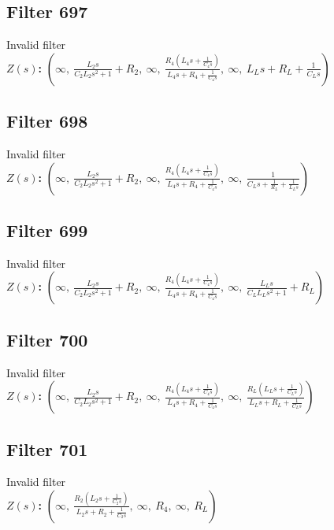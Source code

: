 \documentclass{article}
\begin{document}
\subsection*{Filter 697}
Invalid filter \\ 
\textbf{$Z(s)$:} $\left( \infty, \  \frac{L_{2} s}{C_{2} L_{2} s^{2} + 1} + R_{2}, \  \infty, \  \frac{R_{4} \left(L_{4} s + \frac{1}{C_{4} s}\right)}{L_{4} s + R_{4} + \frac{1}{C_{4} s}}, \  \infty, \  L_{L} s + R_{L} + \frac{1}{C_{L} s}\right)$ \\ 
\subsection*{Filter 698}
Invalid filter \\ 
\textbf{$Z(s)$:} $\left( \infty, \  \frac{L_{2} s}{C_{2} L_{2} s^{2} + 1} + R_{2}, \  \infty, \  \frac{R_{4} \left(L_{4} s + \frac{1}{C_{4} s}\right)}{L_{4} s + R_{4} + \frac{1}{C_{4} s}}, \  \infty, \  \frac{1}{C_{L} s + \frac{1}{R_{L}} + \frac{1}{L_{L} s}}\right)$ \\ 
\subsection*{Filter 699}
Invalid filter \\ 
\textbf{$Z(s)$:} $\left( \infty, \  \frac{L_{2} s}{C_{2} L_{2} s^{2} + 1} + R_{2}, \  \infty, \  \frac{R_{4} \left(L_{4} s + \frac{1}{C_{4} s}\right)}{L_{4} s + R_{4} + \frac{1}{C_{4} s}}, \  \infty, \  \frac{L_{L} s}{C_{L} L_{L} s^{2} + 1} + R_{L}\right)$ \\ 
\subsection*{Filter 700}
Invalid filter \\ 
\textbf{$Z(s)$:} $\left( \infty, \  \frac{L_{2} s}{C_{2} L_{2} s^{2} + 1} + R_{2}, \  \infty, \  \frac{R_{4} \left(L_{4} s + \frac{1}{C_{4} s}\right)}{L_{4} s + R_{4} + \frac{1}{C_{4} s}}, \  \infty, \  \frac{R_{L} \left(L_{L} s + \frac{1}{C_{L} s}\right)}{L_{L} s + R_{L} + \frac{1}{C_{L} s}}\right)$ \\ 
\subsection*{Filter 701}
Invalid filter \\ 
\textbf{$Z(s)$:} $\left( \infty, \  \frac{R_{2} \left(L_{2} s + \frac{1}{C_{2} s}\right)}{L_{2} s + R_{2} + \frac{1}{C_{2} s}}, \  \infty, \  R_{4}, \  \infty, \  R_{L}\right)$ \\ 
\end{document}
